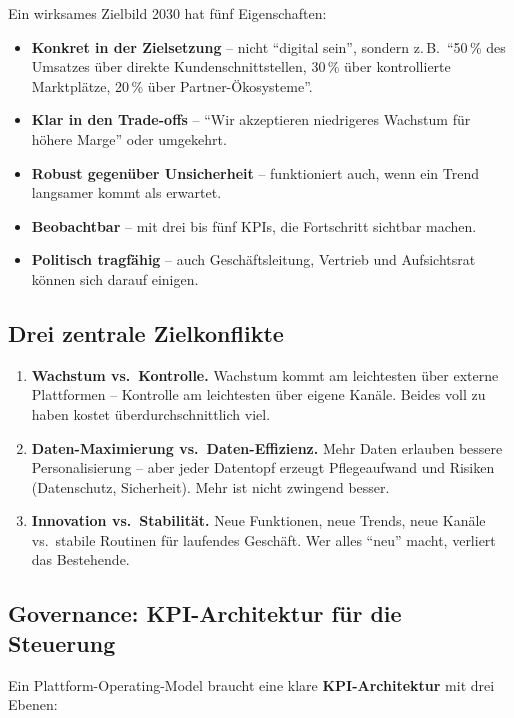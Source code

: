 \documentclass[11pt,a4paper,oneside]{article}
\newcommand{\fachbegriff}[1]{\textbf{#1}}
\begin{document}
Ein wirksames Zielbild 2030 hat fünf Eigenschaften:

\begin{itemize}
  \item \textbf{Konkret in der Zielsetzung} -- nicht ``digital sein'', sondern z.\,B.\ ``50\,\% des Umsatzes über direkte Kundenschnittstellen, 30\,\% über kontrollierte Marktplätze, 20\,\% über Partner-Ökosysteme''.
  \item \textbf{Klar in den Trade-offs} -- ``Wir akzeptieren niedrigeres Wachstum für höhere Marge'' oder umgekehrt.
  \item \textbf{Robust gegenüber Unsicherheit} -- funktioniert auch, wenn ein Trend langsamer kommt als erwartet.
  \item \textbf{Beobachtbar} -- mit drei bis fünf KPIs, die Fortschritt sichtbar machen.
  \item \textbf{Politisch tragfähig} -- auch Geschäftsleitung, Vertrieb und Aufsichtsrat können sich darauf einigen.
\end{itemize}

\subsection{Drei zentrale Zielkonflikte}

\begin{enumerate}
  \item \textbf{Wachstum vs.\ Kontrolle.} Wachstum kommt am leichtesten über externe Plattformen -- Kontrolle am leichtesten über eigene Kanäle. Beides voll zu haben kostet überdurchschnittlich viel.
  \item \textbf{Daten-Maximierung vs.\ Daten-Effizienz.} Mehr Daten erlauben bessere Personalisierung -- aber jeder Datentopf erzeugt Pflegeaufwand und Risiken (Datenschutz, Sicherheit). Mehr ist nicht zwingend besser.
  \item \textbf{Innovation vs.\ Stabilität.} Neue Funktionen, neue Trends, neue Kanäle vs.\ stabile Routinen für laufendes Geschäft. Wer alles ``neu'' macht, verliert das Bestehende.
\end{enumerate}

\subsection{Governance: KPI-Architektur für die Steuerung}

Ein Plattform-Operating-Model braucht eine klare \fachbegriff{KPI-Architektur} mit drei Ebenen:
\end{document}
